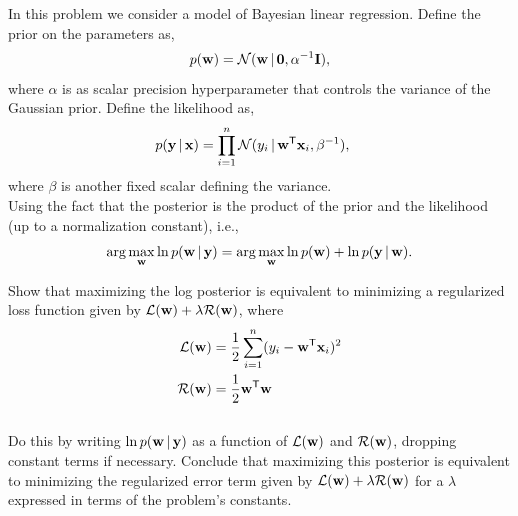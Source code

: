 \documentclass[submit]{harvardml}
\begin{document}
	
	
	
	
	
	
	
	
	
	
	\newpage
	\begin{problem}
		In this problem we consider a model of Bayesian linear regression. Define the prior on the parameters as,
		\begin{align*}
		p(\mathbf{w}) = \mathcal{N}(\mathbf{w} \,|\, \bold0, \alpha^{-1}\mathbf{I} ),
		\end{align*}
		where $\alpha$ is as scalar precision hyperparameter that controls the variance of the Gaussian prior.  Define the likelihood as,
		\begin{align*}
		p(\mathbf{y} \,|\, \mathbf{x}) &= \prod_{i=1}^n \mathcal{N}(y_i \,|\, \mathbf{w}^{\mathsf{T}} \mathbf{x}_i, \beta^{-1}),
		\end{align*}
		where $\beta$ is another fixed scalar defining the variance. \\
		
		
		\noindent Using the fact that the posterior is the product of the prior and the likelihood (up to a normalization constant), i.e., 
		\[\arg\max_{\mathbf{w}} \ln p(\mathbf{w} \,|\, \mathbf{y})= \arg\max_{\mathbf{w}} \ln p(\mathbf{w}) + \ln p(\mathbf{y} \,|\, \mathbf{w}).\]
		
		\noindent Show that maximizing the log posterior is equivalent to minimizing a regularized loss function given by ${\mathcal{L}(\mathbf{w}) + \lambda \mathcal{R}(\mathbf{w})}$, where
		\begin{align*}
		\mathcal{L}(\mathbf{w}) &= \frac{1}{2}\sum_{i = 1}^n (y_i - \mathbf{w}^{\mathsf{T}} \mathbf{x}_i)^2 \\
		\mathcal{R}(\mathbf{w}) &= \frac{1}{2}\mathbf{w}^{\mathsf{T}} \mathbf{w}
		\end{align*} \\
		
		\noindent Do this by writing $\ln p(\mathbf{w} \,|\, \mathbf{y})$ as a function of $\mathcal{L}(\mathbf{w})$ and $\mathcal{R}(\mathbf{w})$, dropping constant terms if necessary.  Conclude that maximizing this posterior is equivalent to minimizing the regularized error term given by $\mathcal{L}(\mathbf{w}) + \lambda \mathcal{R}(\mathbf{w})$ for a $\lambda$ expressed in terms of the problem's constants.  
	\end{problem}
	
\end{document}
